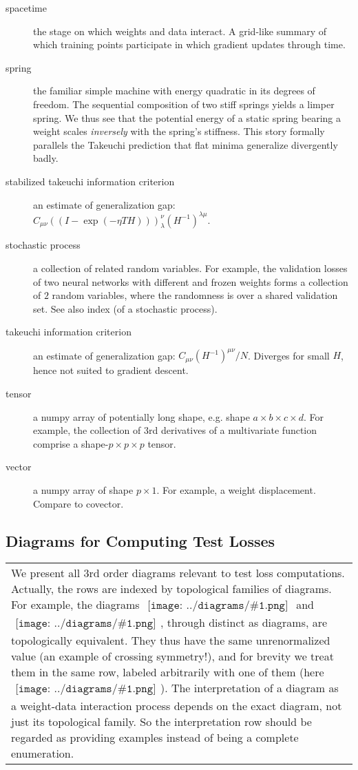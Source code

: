 \documentclass{article}
\theoremstyle{plain}
\theoremstyle{definition}
\newcommand{\wrap}[1]{\left(#1\right)}
\newcommand{\sdia}[1]{\begin{gathered}\texttt{[image: ../diagrams/\#1.png]}\end{gathered}}
\begin{document}
\begin{description}
        \item[spacetime] the stage on which weights and data interact.  A grid-like summary of which training points participate in which gradient updates through time. 
        \item[spring] the familiar simple machine with energy quadratic in its degrees of freedom.  The sequential composition of two stiff springs yields a limper spring.  We thus see that the potential energy of a static spring bearing a weight scales \emph{inversely} with the spring's stiffness.  This story formally parallels the Takeuchi prediction that flat minima generalize divergently badly.
        \item[stabilized takeuchi information criterion] an estimate of generalization gap: $C_{\mu\nu}\wrap{(I - \exp(-\eta T H))}^{\nu}_{\lambda}\wrap{H^{-1}}^{\lambda\mu}$. 
        \item[stochastic process] a collection of related random variables.  For example, the validation losses of two neural networks with different and frozen weights forms a collection of $2$ random variables, where the randomness is over a shared validation set.  See also index (of a stochastic process).
        \item[takeuchi information criterion] an estimate of generalization gap: $C_{\mu\nu}(H^{-1})^{\mu\nu}/N$.  Diverges for small $H$, hence not suited to gradient descent.
        \item[tensor] a numpy array of potentially long shape, e.g. shape $a\times b\times c\times d$.  For example, the collection of $3$rd derivatives of a multivariate function comprise a shape-$p\times p\times p$ tensor. 
        \item[vector] a numpy array of shape $p\times 1$.  For example, a weight displacement.  Compare to covector.
    \end{description}

    \clearpage
    \newpage

    \subsection{
        Diagrams for Computing Test Losses
    }

    \begin{tabular}{p{}}
        We present all $3$rd order diagrams relevant to test loss computations.
        Actually, the rows are indexed by topological families of diagrams.  For
        example, the diagrams $\sdia{(0-1-2)(01-12)}$ and
        $\sdia{(0-1-2)(02-12)}$, through distinct as diagrams, are
        topologically equivalent.  They thus have the same unrenormalized value
        (an example of crossing symmetry!), and for brevity we treat them
        in the same row, labeled arbitrarily with one of them (here
        $\sdia{(0-1-2)(02-12)}$).  The interpretation of a diagram as a
        weight-data interaction process depends on the exact diagram, not just
        its topological family.  So the interpretation row should be regarded
        as providing examples instead of being a complete enumeration.
    \end{tabular}    
\end{document}
